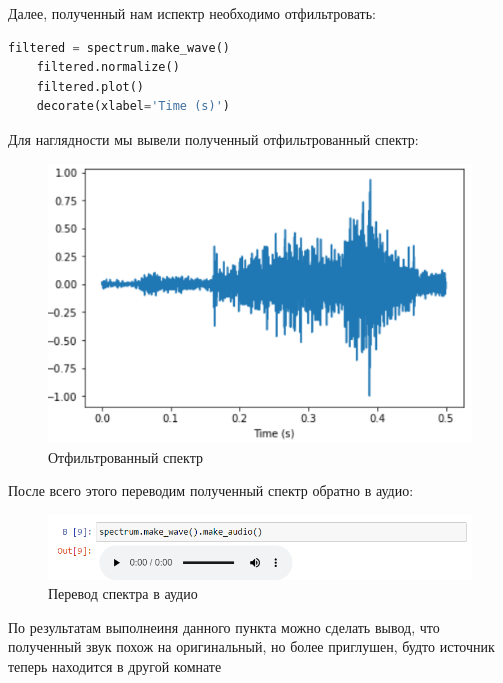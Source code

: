 \documentclass[a4paper]{article}
\begin{document}
            Далее, полученный нам испектр необходимо отфильтровать:

\begin{lstlisting}[language=Python, caption= Фильтрация спектра]
    filtered = spectrum.make_wave()
    filtered.normalize()
    filtered.plot()
    decorate(xlabel='Time (s)')
\end{lstlisting}

            Для наглядности мы вывели полученный отфильтрованный спектр:
            
             \begin{figure}[H]
                \centering
                \includegraphics[width=\textwidth]{spectr_filter.png}
                \caption{Отфильтрованный спектр}
                \label{fig:spectr_filter}
            \end{figure}
            
            После всего этого переводим полученный спектр обратно в аудио:
            
            \begin{figure}[H]
                \centering
                \includegraphics[width=\textwidth]{translate.png}
                \caption{Перевод спектра в аудио}
                \label{fig:spectr_translate}
            \end{figure}
            
            По результатам выполнеиня данного пункта можно сделать вывод, что полученный звук похож на оригинальный, но более приглушен, будто источник теперь находится в другой комнате
            
\end{document}
